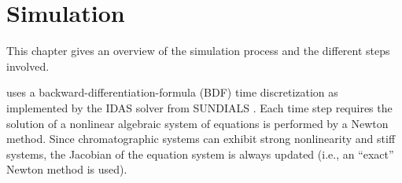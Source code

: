 %  
%  

\chapter{Simulation}

This chapter gives an overview of the simulation process and the different steps involved.

\CADET{} uses a backward-differentiation-formula (BDF) time discretization as implemented by the IDAS solver from SUNDIALS \cite{Hindmarsh2005}.
Each time step requires the solution of a nonlinear algebraic system of equations is performed by a Newton method.
Since chromatographic systems can exhibit strong nonlinearity and stiff systems, the Jacobian of the equation system is always updated (i.e., an ``exact'' Newton method is used).

